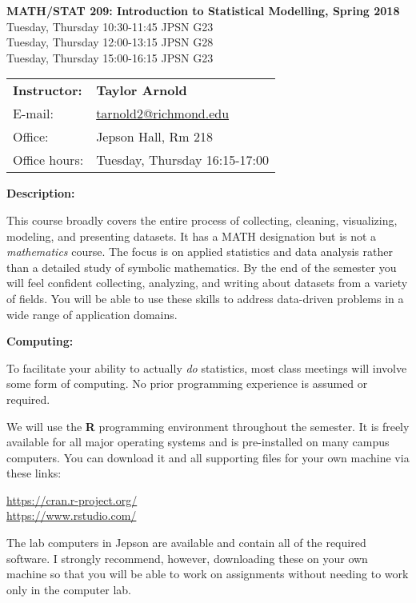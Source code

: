 \documentclass[12pt]{article}
\begin{document}
\begin{center}
{\bf MATH/STAT 209: Introduction to Statistical Modelling, Spring 2018} \\
Tuesday, Thursday 10:30-11:45 \quad JPSN G23\\
Tuesday, Thursday 12:00-13:15 \quad JPSN G28\\
Tuesday, Thursday 15:00-16:15 \quad JPSN G23
\end{center}

\bigskip

\noindent
\begin{tabular}{ l l }
{\bf Instructor:} &  {\bf Taylor Arnold} \\
E-mail: & \href{mailto:tarnold2@richmond.edu}{tarnold2@richmond.edu} \\
Office: & Jepson Hall, Rm 218 \\
Office hours: & Tuesday, Thursday 16:15-17:00
\end{tabular}

\vspace{0.5cm}

\textbf{Description:} \vspace{6pt}

This course broadly covers the entire process of collecting,
cleaning, visualizing, modeling, and presenting datasets. It
has a MATH designation but is not a \textit{mathematics} course.
The focus is on applied statistics and data analysis
rather than a detailed study of symbolic mathematics. By the end
of the semester you will feel confident collecting, analyzing,
and writing about datasets from a variety of fields. You will be
able to use these skills to address data-driven problems in a wide
range of application domains.

\bigskip

\textbf{Computing:} \vspace{6pt}

To facilitate your ability to actually \textit{do} statistics,
most class meetings will involve some form of computing.
No prior programming experience is assumed or required.

\medskip

We will use the \textbf{R} programming environment throughout the
semester. It is freely available for all major operating systems and
is pre-installed on many campus computers. You can download it and
all supporting files for your own machine via these links:
\begin{center}
\url{https://cran.r-project.org/} \\
\url{https://www.rstudio.com/}
\end{center}
The lab computers in Jepson are available and contain all of the
required software. I strongly recommend, however, downloading these
on your own machine so that you will be able to work on assignments
without needing to work only in the computer lab.
\end{document}

